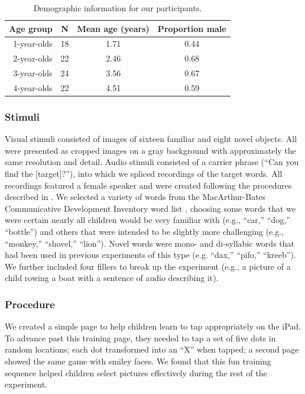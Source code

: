 \documentclass[man,noapacite]{apa2}
\begin{document}
\begin{table}[t]
\centering
\caption{\label{tab:demo} Demographic information for our participants.}
\begin{tabular}{rccc}
  \hline
Age group & N & Mean age (years) & Proportion male \\ 
  \hline
1-year-olds &  18 & 1.71 & 0.44 \\ 
2-year-olds &  22 & 2.46 & 0.68 \\ 
3-year-olds &  24 & 3.56 & 0.67 \\ 
4-year-olds &  22 & 4.51 & 0.59 \\ 
   \hline
\end{tabular}
\end{table}


\subsubsection{Stimuli}

Visual stimuli consisted of images of sixteen familiar and eight novel objects. All were presented as cropped images on a gray background with approximately the same resolution and detail.  Audio stimuli consisted of a carrier phrase (``Can you find the [target]?''), into which we spliced recordings of the target words. All recordings featured a female speaker and were created following the procedures described in . We selected a variety of words from the MacArthur-Bates Communicative Development Inventory word list \cite{fenson1994,fenson2007}, choosing some words that we were certain nearly all children would be very familiar with (e.g., ``car,'' ``dog,'' ``bottle'') and others that were intended to be slightly more challenging (e.g., ``monkey,'' ``shovel,'' ``lion''). Novel words were mono- and di-syllabic words that had been used in previous experiments of this type (e.g. ``dax,'' ``pifo,'' ``kreeb''). We further included four fillers to break up the experiment (e.g., a picture of a child rowing a boat with a sentence of audio describing it).

\subsubsection{Procedure}

We created a simple page to help children learn to tap appropriately on the iPad. To advance past this training page, they needed to tap a set of five dots in random locations; each dot transformed into an ``X'' when tapped; a second page showed the same game with smiley faces. We found that this fun training sequence helped children select pictures effectively during the rest of the experiment.
\end{document}
